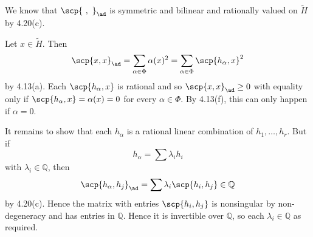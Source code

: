 We know that $\scp{\ ,\ }_{\ad}$ is symmetric and bilinear and rationally
valued on $\tilde{H}$ by 4.20(c).

Let $x \in \tilde{H}$. Then
\[ \scp{x, x}_{\ad} = \sum_{\alpha \in \Phi} \alpha(x)^2 = \sum_{\alpha \in \Phi}\scp{h_{\alpha}, x}^2 \]
by 4.13(a). Each $\scp{h_\alpha, x}$ is rational and so
$\scp{x, x}_{\ad} \geq 0$ with equality only if
$\scp{h_\alpha, x} = \alpha(x) = 0$ for every $\alpha \in \Phi$. By 4.13(f), this
can only happen if $\alpha = 0$.

It remains to show that each $h_\alpha$ is a rational linear combination
of $h_1, \ldots, h_r$. But if
\[ h_\alpha = \sum \lambda_i h_i \] with $\lambda_i \in \mathbb{Q}$, then
\[ \scp{h_\alpha, h_j}_{\ad} = \sum \lambda_i\scp{h_i, h_j} \in \mathbb{Q} \]
by 4.20(c). Hence the matrix with entries $\scp{h_i, h_j}$ is nonsingular
by non-degeneracy and has entries in $\mathbb{Q}$. Hence it is invertible over
$\mathbb{Q}$, so each $\lambda_i \in \mathbb{Q}$ as required.
